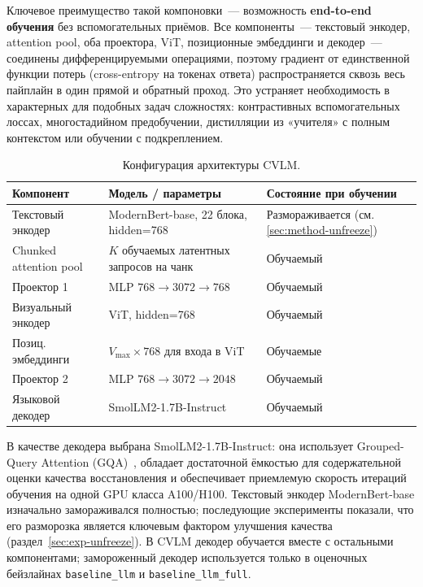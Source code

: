 \documentclass[a4paper,12pt]{extarticle}
\begin{document}
Ключевое преимущество такой компоновки~--- возможность \textbf{end-to-end обучения} без вспомогательных приёмов. Все компоненты~--- текстовый энкодер, attention pool, оба проектора, ViT, позиционные эмбеддинги и декодер~--- соединены дифференцируемыми операциями, поэтому градиент от единственной функции потерь (cross-entropy на токенах ответа) распространяется сквозь весь пайплайн в один прямой и обратный проход. Это устраняет необходимость в характерных для подобных задач сложностях: контрастивных вспомогательных лоссах, многостадийном предобучении, дистилляции из «учителя» с полным контекстом или обучении с подкреплением.

\begin{table}[ht]
\centering
\caption{Конфигурация архитектуры CVLM.}
\label{tab:architecture-final}
\footnotesize
\begin{tabular}{lll}
\toprule
\textbf{Компонент} & \textbf{Модель / параметры} & \textbf{Состояние при обучении}\\
\midrule
Текстовый энкодер & ModernBert-base, 22 блока, hidden=768 & Размораживается (см. \ref{sec:method-unfreeze})\\
Chunked attention pool & $K$ обучаемых латентных запросов на чанк & Обучаемый \\
Проектор 1        & MLP $768 \to 3072 \to 768$  & Обучаемый \\
Визуальный энкодер & ViT, hidden=768 & Обучаемый \\
Позиц. эмбеддинги & $V_{\max} \times 768$ для входа в ViT & Обучаемые \\
Проектор 2        & MLP $768 \to 3072 \to 2048$ & Обучаемый \\
Языковой декодер  & SmolLM2-1.7B-Instruct & Обучаемый \\
\bottomrule
\end{tabular}
\end{table}

В качестве декодера выбрана SmolLM2-1.7B-Instruct: она использует Grouped-Query Attention (GQA)~\cite{gqa}, обладает достаточной ёмкостью для содержательной оценки качества восстановления и обеспечивает приемлемую скорость итераций обучения на одной GPU класса A100/H100. Текстовый энкодер ModernBert-base изначально замораживался полностью; последующие эксперименты показали, что его разморозка является ключевым фактором улучшения качества (раздел~\ref{sec:exp-unfreeze}). В CVLM декодер обучается вместе с остальными компонентами; замороженный декодер используется только в оценочных бейзлайнах \texttt{baseline\_llm} и \texttt{baseline\_llm\_full}.
\end{document}

